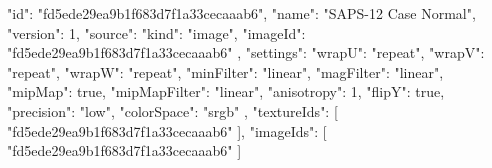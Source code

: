 {
  "id": "fd5ede29ea9b1f683d7f1a33cecaaab6",
  "name": "SAPS-12 Case Normal",
  "version": 1,
  "source": {
    "kind": "image",
    "imageId": "fd5ede29ea9b1f683d7f1a33cecaaab6"
  },
  "settings": {
    "wrapU": "repeat",
    "wrapV": "repeat",
    "wrapW": "repeat",
    "minFilter": "linear",
    "magFilter": "linear",
    "mipMap": true,
    "mipMapFilter": "linear",
    "anisotropy": 1,
    "flipY": true,
    "precision": "low",
    "colorSpace": "srgb"
  },
  "textureIds": [
    "fd5ede29ea9b1f683d7f1a33cecaaab6"
  ],
  "imageIds": [
    "fd5ede29ea9b1f683d7f1a33cecaaab6"
  ]
}
